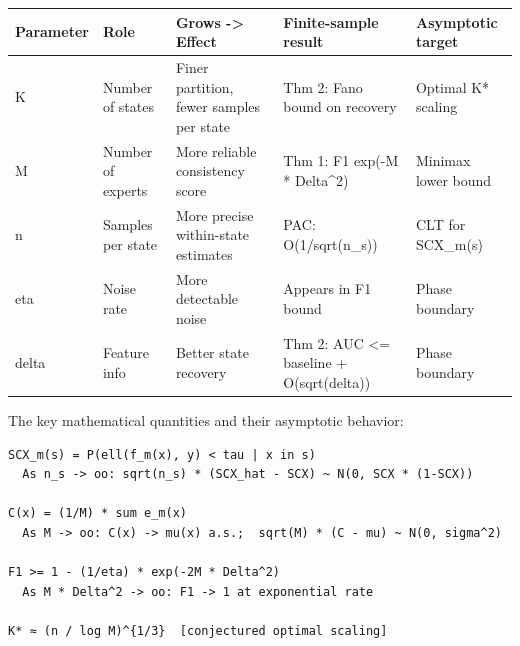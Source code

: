\documentclass[
  12pt,
]{article}
\begin{document}
\begin{longtable}[]{@{}
  >{\raggedright\arraybackslash}p{}
  >{\raggedright\arraybackslash}p{}
  >{\raggedright\arraybackslash}p{}
  >{\raggedright\arraybackslash}p{}
  >{\raggedright\arraybackslash}p{}@{}}
\toprule\noalign{}
\begin{minipage}[b]{\linewidth}\raggedright
Parameter
\end{minipage} & \begin{minipage}[b]{\linewidth}\raggedright
Role
\end{minipage} & \begin{minipage}[b]{\linewidth}\raggedright
Grows -\textgreater{} Effect
\end{minipage} & \begin{minipage}[b]{\linewidth}\raggedright
Finite-sample result
\end{minipage} & \begin{minipage}[b]{\linewidth}\raggedright
Asymptotic target
\end{minipage} \\
\midrule\noalign{}
\endhead
\bottomrule\noalign{}
\endlastfoot
K & Number of states & Finer partition, fewer samples per state & Thm 2:
Fano bound on recovery & Optimal K* scaling \\
M & Number of experts & More reliable consistency score & Thm 1: F1
exp(-M * Delta\^{}2) & Minimax lower bound \\
n & Samples per state & More precise within-state estimates & PAC:
O(1/sqrt(n\_s)) & CLT for SCX\_m(s) \\
eta & Noise rate & More detectable noise & Appears in F1 bound & Phase
boundary \\
delta & Feature info & Better state recovery & Thm 2: AUC \textless=
baseline + O(sqrt(delta)) & Phase boundary \\
\end{longtable}

The key mathematical quantities and their asymptotic behavior:

\begin{verbatim}
SCX_m(s) = P(ell(f_m(x), y) < tau | x in s)
  As n_s -> oo: sqrt(n_s) * (SCX_hat - SCX) ~ N(0, SCX * (1-SCX))

C(x) = (1/M) * sum e_m(x)
  As M -> oo: C(x) -> mu(x) a.s.;  sqrt(M) * (C - mu) ~ N(0, sigma^2)

F1 >= 1 - (1/eta) * exp(-2M * Delta^2)
  As M * Delta^2 -> oo: F1 -> 1 at exponential rate

K* ≈ (n / log M)^{1/3}  [conjectured optimal scaling]
\end{verbatim}
\end{document}
